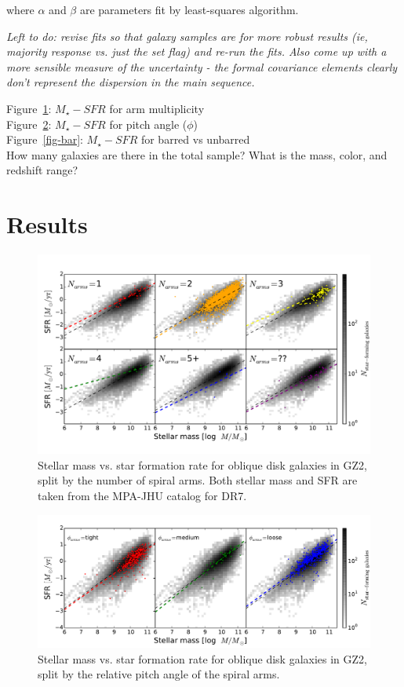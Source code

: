 \documentclass{emulateapj}
\begin{document}
\noindent where $\alpha$ and $\beta$ are parameters fit by least-squares algorithm.

\emph{Left to do: revise fits so that galaxy samples are for more robust results (ie, majority response vs. just the set flag) and re-run the fits. Also come up with a more sensible measure of the uncertainty - the formal covariance elements clearly don't represent the dispersion in the main sequence.}

Figure~\ref{fig-number}: $M_\star-SFR$ for arm multiplicity \\
Figure~\ref{fig-winding}: $M_\star-SFR$ for pitch angle ($\phi$) \\
Figure~\ref{fig-bar}: $M_\star-SFR$ for barred vs unbarred \\

How many galaxies are there in the total sample? What is the mass, color, and redshift range?


\section{Results} \label{sec-results}

\begin{figure}
\includegraphics[angle=0,width=7.0in]{figures/ms_arms_number.pdf}
\caption{Stellar mass vs. star formation rate for oblique disk galaxies in GZ2, split by the number of spiral arms. Both stellar mass and SFR are taken from the MPA-JHU catalog for DR7. 
\label{fig-number}}
\end{figure}

\begin{figure}
\includegraphics[angle=0,width=7.0in]{figures/ms_arms_winding.pdf}
\caption{Stellar mass vs. star formation rate for oblique disk galaxies in GZ2, split by the relative pitch angle of the spiral arms. 
\label{fig-winding}}
\end{figure}
\end{document}
